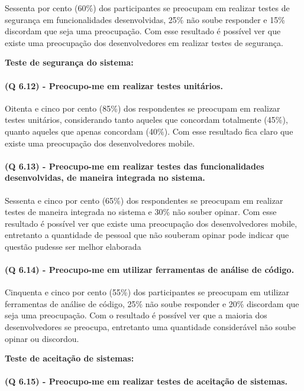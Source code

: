Sessenta por cento (60{\%}) dos participantes se preocupam em realizar testes de segurança em funcionalidades desenvolvidas, 25{\%} não soube responder e 15{\%} discordam que seja uma preocupação. Com esse resultado é possível ver que existe uma preocupação dos desenvolvedores em realizar testes de segurança.


\vspace{0.5cm}
\noindent\textbf{Teste de segurança do sistema:}
\paragraph{\textbf{(Q 6.12)} - Preocupo-me em realizar testes unitários.}

Oitenta e cinco por cento (85{\%}) dos respondentes se preocupam em realizar testes unitários, considerando tanto aqueles que concordam totalmente (45{\%}), quanto aqueles que apenas concordam (40{\%}). Com esse resultado fica claro que existe uma preocupação dos desenvolvedores mobile.

\paragraph{\textbf{(Q 6.13)} - Preocupo-me em realizar testes das funcionalidades desenvolvidas, de maneira integrada no sistema.}

Sessenta e cinco por cento (65{\%}) dos respondentes se preocupam em realizar testes de maneira integrada no sistema e 30{\%} não souber opinar. Com esse resultado é possível ver que existe uma preocupação dos desenvolvedores mobile, entretanto a quantidade de pessoal que não souberam opinar pode indicar que questão pudesse ser melhor elaborada

\paragraph{\textbf{(Q 6.14)} - Preocupo-me em utilizar ferramentas de análise de código.}

Cinquenta e cinco por cento (55{\%}) dos participantes se preocupam em utilizar ferramentas de análise de código, 25{\%} não soube responder e 20{\%} discordam que seja uma preocupação. Com o resultado é possível ver que a maioria dos desenvolvedores se preocupa, entretanto uma quantidade considerável não soube opinar ou discordou.

\vspace{0.5cm}
\noindent\textbf{Teste de aceitação de sistemas:}
\paragraph{\textbf{(Q 6.15)} - Preocupo-me em realizar testes de aceitação de sistemas.}


